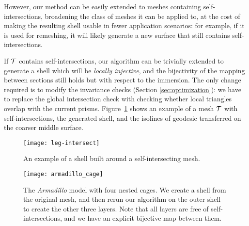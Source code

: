 However, our method can be easily extended to meshes containing self-intersections, broadening the class of meshes it can be applied to, at the cost of making the resulting shell usable in fewer application scenarios: for example, if it is used for remeshing, it will likely generate a new surface that still contains self-intersections.

If $\mathcal{T}$ contains self-intersections, our algorithm can be trivially extended to generate a shell which will be \emph{locally injective}, and the bijectivity of the mapping between sections still holds but with respect to the immersion. The only change required is to modify the invariance checks (Section \ref{sec:optimization}): we have to replace the global intersection check with checking whether local triangles overlap with the current prisms. Figure~\ref{fig:intersect-leg} shows an example of a mesh $\mathcal{T}$ with self-intersections, the generated shell, and the isolines of geodesic transferred on the coarser middle surface.
\begin{figure}
    \centering
    \texttt{[image: leg-intersect]}
    \caption{An example of a shell built around a self-intersecting mesh.}
    \label{fig:intersect-leg}
    
\end{figure}


\begin{figure}
    \centering
    \texttt{[image: armadillo\_cage]}
    \caption{The \protect\emph{Armadillo} model with four nested cages. We create a shell from the original mesh, and then rerun our algorithm on the outer shell to create the other three layers. Note that all layers are free of self-intersections, and we have an explicit bijective map between them.}
    
    \label{fig:nested-cages}
\end{figure}

